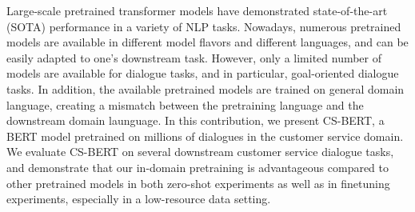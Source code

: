 Large-scale pretrained transformer models have demonstrated state-of-the-art (SOTA) performance in a variety of NLP tasks. Nowadays, numerous pretrained models are available in different model flavors and different languages, and can be easily adapted to one's downstream task. However, only a limited number of models are available for dialogue tasks, and in particular, goal-oriented dialogue tasks. In addition, the available pretrained models are trained on general domain language, creating a mismatch between the pretraining language and the downstream domain launguage. In this contribution, we present CS-BERT, a BERT model pretrained on millions of dialogues in the customer service domain. We evaluate CS-BERT on several downstream customer service dialogue tasks, and demonstrate that our in-domain pretraining is advantageous compared to other pretrained models in both zero-shot experiments as well as in finetuning experiments, especially in a low-resource data setting.

